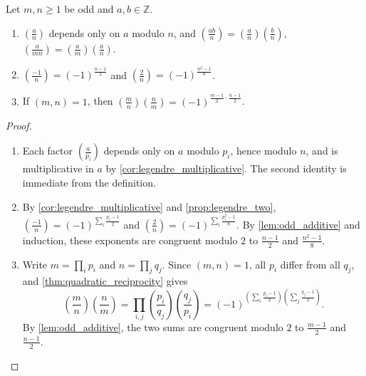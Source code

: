 \begin{theorem}\label{thm:jacobi_properties}
    Let $m, n \ge 1$ be odd and $a, b \in \mathbb{Z}$.
    \begin{enumerate}[label={\upshape\roman*)}]
        \item $\left(\frac{a}{n}\right)$ depends only on $a$ modulo $n$, and $\left(\frac{ab}{n}\right) = \left(\frac{a}{n}\right)\left(\frac{b}{n}\right)$, $\left(\frac{a}{mn}\right) = \left(\frac{a}{m}\right)\left(\frac{a}{n}\right)$.
        \item $\left(\frac{-1}{n}\right) = (-1)^{\frac{n-1}{2}}$ and $\left(\frac{2}{n}\right) = (-1)^{\frac{n^2-1}{8}}$.
        \item If $(m,n) = 1$, then $\left(\frac{m}{n}\right)\left(\frac{n}{m}\right) = (-1)^{\frac{m-1}{2}\cdot\frac{n-1}{2}}$.
    \end{enumerate}
\end{theorem}
\begin{proof}
    \begin{enumerate}[label={\upshape\roman*)}]
        \item Each factor $\left(\frac{a}{p_i}\right)$ depends only on $a$ modulo $p_i$, hence modulo $n$, and is multiplicative in $a$ by \cref{cor:legendre_multiplicative}. The second identity is immediate from the definition.
        \item By \cref{cor:legendre_multiplicative} and \cref{prop:legendre_two}, $\left(\frac{-1}{n}\right) = (-1)^{\sum_i \frac{p_i - 1}{2}}$ and $\left(\frac{2}{n}\right) = (-1)^{\sum_i \frac{p_i^2 - 1}{8}}$. By \cref{lem:odd_additive} and induction, these exponents are congruent modulo $2$ to $\frac{n-1}{2}$ and $\frac{n^2-1}{8}$.
        \item Write $m = \prod_i p_i$ and $n = \prod_j q_j$. Since $(m,n) = 1$, all $p_i$ differ from all $q_j$, and \cref{thm:quadratic_reciprocity} gives
        \begin{equation*}
            \left(\frac{m}{n}\right)\left(\frac{n}{m}\right) = \prod_{i,j}\left(\frac{p_i}{q_j}\right)\left(\frac{q_j}{p_i}\right) = (-1)^{\left(\sum_i \frac{p_i-1}{2}\right)\left(\sum_j \frac{q_j-1}{2}\right)}.
        \end{equation*}
        By \cref{lem:odd_additive}, the two sums are congruent modulo $2$ to $\frac{m-1}{2}$ and $\frac{n-1}{2}$.
    \end{enumerate}
\end{proof}

